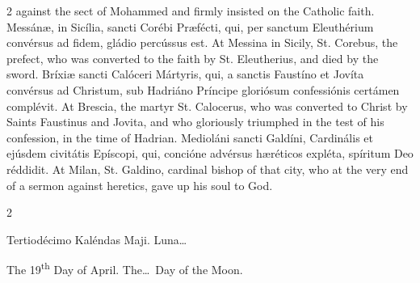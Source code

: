\begin{paracol}{2}
 against the sect of Mohammed and firmly insisted on the Catholic faith.
\switchcolumn*
{}
Messánæ, in Sicília, 
 sancti Corébi Præfécti, qui, per sanctum Eleuthérium convérsus ad fidem, 
 gládio percússus est.
\switchcolumn
{}
At Messina in Sicily, St. Corebus, 
 the prefect, who was converted to the faith by St. Eleutherius, and died by 
 the sword.
\switchcolumn*
{}
Bríxiæ sancti Calóceri 
 Mártyris, qui, a sanctis Faustíno et Jovíta convérsus ad Christum, sub 
 Hadriáno Príncipe gloriósum confessiónis certámen complévit.
\switchcolumn
{}
At Brescia, the martyr St. 
 Calocerus, who was converted to Christ by Saints Faustinus and Jovita, and 
 who gloriously triumphed in the test of his confession, in the time of 
 Hadrian.
\switchcolumn*
{}
Medioláni sancti 
 Galdíni, Cardinális et ejúsdem civitátis Epíscopi, qui, concióne advérsus 
 hæréticos expléta, spíritum Deo réddidit.
\switchcolumn
{}
At Milan, St. Galdino, cardinal 
 bishop of that city, who at the very end of a sermon against heretics, gave 
 up his soul to God.
\switchcolumn*
{}
\end{paracol}


\begin{paracol}{2}
\begin{center}{\color{gregoriocolor} Tertiodécimo Kaléndas Maji. 
 Luna\dots\ }\end{center}
\switchcolumn
{}
\begin{center}{\color{gregoriocolor} The 19\textsuperscript{th} Day of April. The\dots\ Day of the Moon.}\end{center}
\end{paracol}

